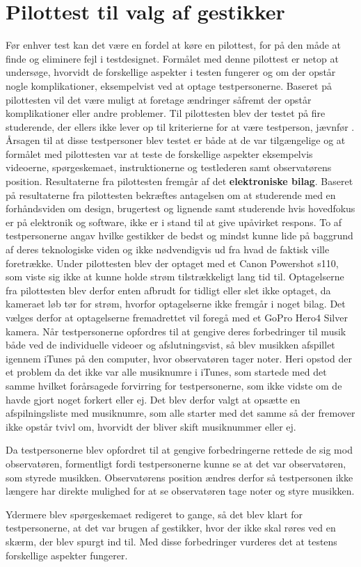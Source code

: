 \section{Pilottest til valg af gestikker}
\label{PilottestValgAfGestikker}
%
Før enhver test kan det være en fordel at køre en pilottest, for på den måde at finde og eliminere fejl i testdesignet. Formålet med denne pilottest er netop at undersøge, hvorvidt de forskellige aspekter i testen fungerer og om der opstår nogle komplikationer, eksempelvist ved at optage testpersonerne. Baseret på pilottesten vil det være muligt at foretage ændringer såfremt der opstår komplikationer eller andre problemer.\blankline
%  
Til pilottesten blev der testet på fire studerende, der ellers ikke lever op til kriterierne for at være testperson, jævnfør . Årsagen til at disse testpersoner blev testet er både at de var tilgængelige og at formålet med pilottesten var at teste de forskellige aspekter eksempelvis videoerne, spørgeskemaet, instruktionerne og testlederen samt observatørens position. Resultaterne fra pilottesten fremgår af det \textbf{elektroniske bilag}. Baseret på resultaterne fra pilottesten bekræftes antagelsen om at studerende med en forhåndsviden om design, brugertest og lignende samt studerende hvis hovedfokus er på elektronik og software, ikke er i stand til at give upåvirket respons. To af testpersonerne angav hvilke gestikker de bedst og mindst kunne lide på baggrund af deres teknologiske viden og ikke nødvendigvis ud fra hvad de faktisk ville foretrække.\blankline
% 
Under pilottesten blev der optaget med et Canon Powershot s110, som viste sig ikke at kunne holde strøm tilstrækkeligt lang tid til. Optagelserne fra pilottesten blev derfor enten afbrudt for tidligt eller slet ikke optaget, da kameraet løb tør for strøm, hvorfor optagelserne ikke fremgår i noget bilag. Det vælges derfor at optagelserne fremadrettet vil foregå med et GoPro Hero4 Silver kamera.\blankline
% 
Når testpersonerne opfordres til at gengive deres forbedringer til musik både ved de individuelle videoer og afslutningsvist, så blev musikken afspillet igennem iTunes på den computer, hvor observatøren tager noter. Heri opstod der et problem da det ikke var alle musiknumre i iTunes, som startede med det samme hvilket forårsagede forvirring for testpersonerne, som ikke vidste om de havde gjort noget forkert eller ej. Det blev derfor valgt at opsætte en afspilningsliste med musiknumre, som alle starter med det samme så der fremover ikke opstår tvivl om, hvorvidt der bliver skift musiknummer eller ej. 

Da testpersonerne blev opfordret til at gengive forbedringerne rettede de sig mod observatøren, formentligt fordi testpersonerne kunne se at det var observatøren, som styrede musikken. Observatørens position ændres derfor så testpersonen ikke længere har direkte mulighed for at se observatøren tage noter og styre musikken. 

Ydermere blev spørgeskemaet redigeret to gange, så det blev klart for testpersonerne, at det var brugen af gestikker, hvor der ikke skal røres ved en skærm, der blev spurgt ind til. \blankline
%
Med disse forbedringer vurderes det at testens forskellige aspekter fungerer.  
 

